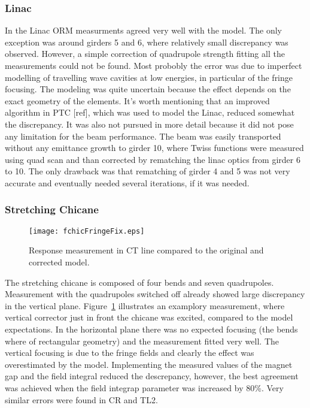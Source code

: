 \subsubsection{Linac}

In the Linac ORM measurments agreed very well with the model. 
The only exception was around girders 5 and 6, where relatively small discrepancy was observed.
However, a simple correction of quadrupole strength fitting all the measurements could not be found.
Most probobly the error was due to imperfect modelling of travelling wave cavities at low energies,
in particular of the fringe focusing.
The modeling was quite uncertain because the effect depends on the exact geometry of the elements. 
It's worth mentioning that an improved algorithm in PTC [ref], 
which was used to model the Linac, reduced somewhat the discrepancy.
It was also not pursued in more detail because it did not pose any limitation 
for the beam performance. The beam was easily transported without any emittance growth to 
girder 10, where Twiss functions were measured using quad scan and than
corrected by rematching the linac optics from girder 6 to 10. The only drawback
was that rematching of girder 4 and 5 was not very accurate and eventually
needed several iterations, if it was needed.

\subsubsection{Stretching Chicane}
%
\begin{figure}[!h]
 \begin{center}
   \texttt{[image: fchicFringeFix.eps]}
 \end{center}
 \caption{Response measurement in CT line compared to the original and corrected model.}
 \label{fig:fchicFringeFix}
\end{figure}
%
The stretching chicane is composed of four bends and seven quadrupoles. 
Measurement with the quadrupoles switched off already showed large discrepancy in 
the vertical plane. Figure~\ref{fig:fchicFringeFix} illustrates an examplory measurement, 
where vertical corrector just in front the chicane was excited, compared to the model expectations. 
In the horizontal plane there was no expected focusing (the bends where of rectangular geometry) and 
the measurement fitted very well. 
The vertical focusing is due to the fringe fields and clearly the effect was overestimated by the model. 
Implementing the measured values of the magnet gap and the field integral reduced the descrepancy,
however, the best agreement was achieved when the field integrap parameter was increased by 80\%.
Very similar errors were found in CR and TL2. 

